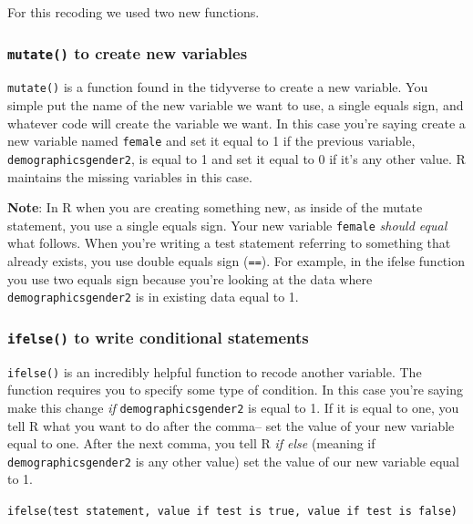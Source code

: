 \documentclass[
]{book}
\begin{document}
For this recoding we used two new functions.

\hypertarget{mutate}{%
\subsubsection*{\texorpdfstring{\texttt{mutate()} to create new variables}{mutate() to create new variables}}\label{mutate}}

\texttt{mutate()} is a function found in the tidyverse to create a new variable. You simple put the name of the new variable we want to use, a single equals sign, and whatever code will create the variable we want. In this case you're saying create a new variable named \texttt{female} and set it equal to 1 if the previous variable, \texttt{demographicsgender2}, is equal to 1 and set it equal to 0 if it's any other value. R maintains the missing variables in this case.

\textbf{Note}: In R when you are creating something new, as inside of the mutate statement, you use a single equals sign. Your new variable \texttt{female} \emph{should equal} what follows. When you're writing a test statement referring to something that already exists, you use double equals sign (\texttt{==}). For example, in the ifelse function you use two equals sign because you're looking at the data where \texttt{demographicsgender2} is in existing data equal to 1.

\hypertarget{ifelse}{%
\subsubsection*{\texorpdfstring{\texttt{ifelse()} to write conditional statements}{ifelse() to write conditional statements}}\label{ifelse}}

\texttt{ifelse()} is an incredibly helpful function to recode another variable. The function requires you to specify some type of condition. In this case you're saying make this change \emph{if} \texttt{demographicsgender2} is equal to 1. If it is equal to one, you tell R what you want to do after the comma-- set the value of your new variable equal to one. After the next comma, you tell R \emph{if else} (meaning if \texttt{demographicsgender2} is any other value) set the value of our new variable equal to 1.

\texttt{ifelse(test\ statement,\ value\ if\ test\ is\ true,\ value\ if\ test\ is\ false)}
\end{document}
